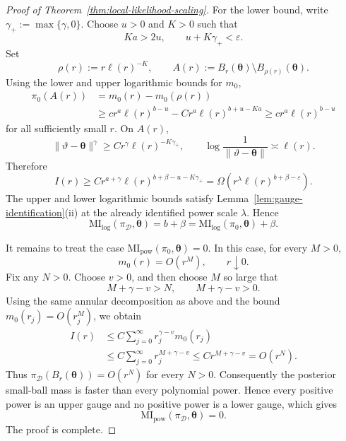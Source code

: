 \documentclass[11pt,a4paper]{article}
\newcommand{\MI}{\mathrm{MI}}
\newcommand{\pa}{\boldsymbol\theta}
\theoremstyle{compactplain}
\theoremstyle{compactdefinition}
\numberwithin{equation}{section}
\begin{document}
\begin{proof}[Proof of Theorem~\ref{thm:local-likelihood-scaling}]
For the lower bound, write \(\gamma_+:=\max\{\gamma,0\}\). Choose \(u>0\) and
\(K>0\) such that
\[
 Ka>2u,
 \qquad
 u+K\gamma_+<\varepsilon .
\]
Set
\[
 \rho(r):=r\ell(r)^{-K},
 \qquad
 A(r):=B_r(\pa)\setminus B_{\rho(r)}(\pa).
\]
Using the lower and upper logarithmic bounds for \(m_0\),
\[
\begin{aligned}
 \pi_0(A(r))
 &=m_0(r)-m_0(\rho(r))\\
 &\ge c r^a\ell(r)^{b-u}
 -C r^a\ell(r)^{b+u-Ka}
 \ge c r^a\ell(r)^{b-u}
\end{aligned}
\]
for all sufficiently small \(r\). On \(A(r)\),
\[
 \|\vartheta-\pa\|^\gamma\ge C r^\gamma\ell(r)^{-K\gamma_+},
 \qquad
 \log\frac1{\|\vartheta-\pa\|}\asymp\ell(r).
\]
Therefore
\[
 I(r)
 \ge C r^{a+\gamma}\ell(r)^{b+\beta-u-K\gamma_+}
 =\Omega\!\left(r^\lambda\ell(r)^{b+\beta-\varepsilon}\right).
\]
The upper and lower logarithmic bounds satisfy
Lemma~\ref{lem:gauge-identification}\textnormal{(ii)} at the already identified power scale
\(\lambda\). Hence
\[
 \MI_{\mathrm{log}}(\pi_{\mathcal D},\pa)
 =b+\beta
 =\MI_{\mathrm{log}}(\pi_0,\pa)+\beta .
\]

It remains to treat the case \(\MI_{\mathrm{pow}}(\pi_0,\pa)=0\). In this case,
for every \(M>0\),
\[
 m_0(r)=O(r^M),
 \qquad r\downarrow0 .
\]
Fix any \(N>0\). Choose \(v>0\), and then choose \(M\) so large that
\[
 M+\gamma-v>N,
 \qquad
 M+\gamma-v>0 .
\]
Using the same annular decomposition as above and the bound
\(m_0(r_j)=O(r_j^M)\), we obtain
\[
\begin{aligned}
 I(r)
 &\le C\sum_{j=0}^{\infty} r_j^{\gamma-v}m_0(r_j) \\
 &\le C\sum_{j=0}^{\infty} r_j^{M+\gamma-v}
 \le C r^{M+\gamma-v}
 =O(r^N).
\end{aligned}
\]
Thus \(\pi_{\mathcal D}(B_r(\pa))=O(r^N)\) for every \(N>0\). Consequently the
posterior small-ball mass is faster than every polynomial power. Hence every
positive power is an upper gauge and no positive power is a lower gauge, which
gives
\[
 \MI_{\mathrm{pow}}(\pi_{\mathcal D},\pa)=0 .
\]
The proof is complete.
\end{proof}
\end{document}
